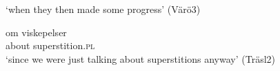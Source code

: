 \documentclass[output=paper,colorlinks,citecolor=brown,draft,draftmode]{langscibook}
\begin{document}
\ea\label{ex:petzell:18}
\glt `when they then made some progress’ (Värö3)

\gll    om      viskepelser   \\
    about    superstition.\textsc{pl}\\
\glt `since we were just talking about superstitions anyway’ (Träsl2)
\z
\z
\end{document}
